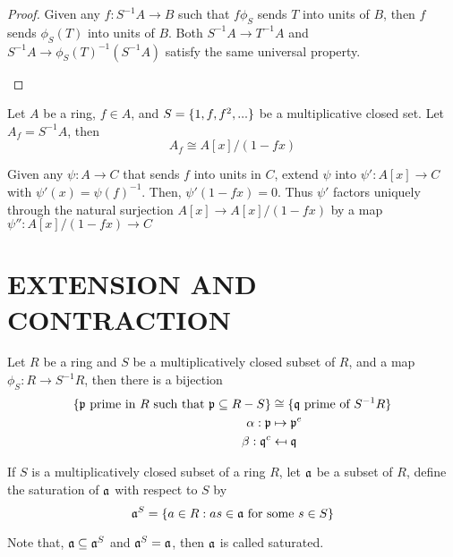 \begin{proof}
	Given any $f: S^{-1} A \to B$ such that $f \phi_S$ sends $T$ into units of $B$, then $f$ sends $\phi_S(T)$ into units of $B$. Both $S^{-1} A \to T^{-1} A$ and $S^{-1} A \to \phi_S(T)^{-1} (S^{-1} A)$ satisfy the same universal property.
	\begin{center}
	\end{center}
\end{proof}

\begin{remark}
	Let $A$ be a ring, $f \in A$, and $S = \{1, f, f^2, ...\}$ be a multiplicative closed set. Let $A_f = S^{-1} A$, then
	$$
		A_f \cong A[x] / (1 - fx)
	$$
	
	Given any $\psi: A \to C$ that sends $f$ into units in $C$, extend $\psi$ into $\psi': A[x] \to C$ with $\psi'(x) = \psi(f)^{-1}$. Then, $\psi'(1 - fx) = 0$. Thus $\psi'$ factors uniquely through the natural surjection $A[x] \to A[x] / (1 - fx)$ by a map $\psi'': A[x] / (1 - fx) \to C$
\end{remark}

\section{EXTENSION AND CONTRACTION}

\begin{theorem}
	Let $R$ be a ring and $S$ be a multiplicatively closed subset of $R$, and a map $\phi_S: R \to S^{-1}R$, then there is a bijection
	\begin{align*}
		\{\text{$\mathfrak{p}$ prime in $R$ such that $\mathfrak{p} \subseteq R - S$}\} &\cong \{\text{$\mathfrak{q}$ prime of $S^{-1} R$}\} \\
		\alpha: \mathfrak{p} &\mapsto \mathfrak{p}^e \\
		\beta:\mathfrak{q}^c &\mapsfrom \mathfrak{q}
	\end{align*}
\end{theorem}

\begin{definition}[saturation]
	If $S$ is a multiplicatively closed subset of a ring $R$, let $\mathfrak{a}$ be a subset of $R$, define the saturation of $\mathfrak{a}$ with respect to $S$ by
	$$
		\mathfrak{a}^S = \{a \in R: as \in \mathfrak{a} \text{ for some } s \in S\}
	$$
	
	Note that, $\mathfrak{a} \subseteq \mathfrak{a}^S$ and $\mathfrak{a}^S = \mathfrak{a}$, then $\mathfrak{a}$ is called saturated.
	
\end{definition}

